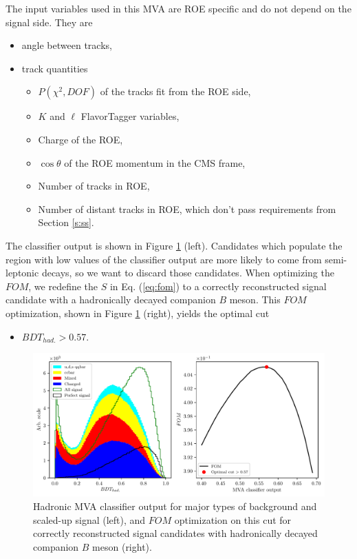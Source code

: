 \documentclass[  headings=standardclasses,
  headings=big,oneside,a4paper,openany,12pt]{scrbook}
\begin{document}
The input variables used in this MVA are ROE specific and do not depend on the signal side. They are
\begin{itemize}
\item angle between tracks,
\item track quantities
	\begin{itemize}
	\item $P(\chi^2,DOF)$ of the tracks fit from the ROE side,
	\item $K$ and $\ell$ FlavorTagger variables,
	\item Charge of the ROE,
	\item $\cos \theta$ of the ROE momentum in the CMS frame,
	\item Number of tracks in ROE,
	\item Number of distant tracks in ROE, which don't pass requirements from Section \ref{s:ss}.
	\end{itemize}
\end{itemize}
%
The classifier output is shown in Figure \ref{fig:hdmva} (left). Candidates which populate the region with low values of the classifier output are more likely to come from semi-leptonic decays, so we want to discard those candidates. When optimizing the $FOM$, we redefine the $S$ in Eq. (\ref{eq:fom}) to a correctly reconstructed signal candidate with a hadronically decayed companion $B$ meson. This $FOM$ optimization, shown in Figure \ref{fig:hdmva} (right), yields the optimal cut
\begin{itemize}
\item $BDT_{had.} > 0.57.$
\end{itemize} 

\begin{figure}[H]
\centering
\captionsetup{width=0.8\linewidth}
\includegraphics[width=\linewidth]{fig/hdmva_opt}
\caption{Hadronic MVA classifier output for major types of background and scaled-up signal (left), and $FOM$ optimization on this cut for correctly reconstructed signal candidates with hadronically decayed companion $B$ meson (right).}
\label{fig:hdmva}
\end{figure}
\end{document}
